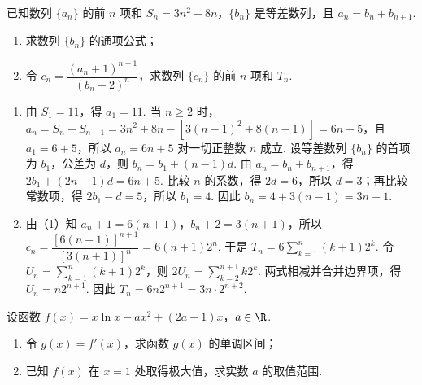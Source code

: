 \begin{problem}
已知数列 \(\{a_n\}\) 的前 \(n\) 项和 \(S_n=3n^2+8n\)，\(\{b_n\}\) 是等差数列，且 \(a_n=b_n+b_{n+1}\).

\begin{enumerate}
\item 求数列 \(\{b_n\}\) 的通项公式；
\item 令 \(c_n=\dfrac{(a_n+1)^{n+1}}{(b_n+2)^n}\)，求数列 \(\{c_n\}\) 的前 \(n\) 项和 \(T_n\).
\end{enumerate}
\end{problem}

\begin{solution}
\begin{enumerate}
\item 由 \(S_1=11\)，得 \(a_1=11\). 当 \(n\geq2\) 时，\(a_n=S_n-S_{n-1}=3n^2+8n-\left[3(n-1)^2+8(n-1)\right]=6n+5\)，且 \(a_1=6+5\)，所以 \(a_n=6n+5\) 对一切正整数 \(n\) 成立. 设等差数列 \(\{b_n\}\) 的首项为 \(b_1\)，公差为 \(d\)，则 \(b_n=b_1+(n-1)d\). 由 \(a_n=b_n+b_{n+1}\)，得 \(2b_1+(2n-1)d=6n+5\). 比较 \(n\) 的系数，得 \(2d=6\)，所以 \(d=3\)；再比较常数项，得 \(2b_1-d=5\)，所以 \(b_1=4\). 因此 \(b_n=4+3(n-1)=3n+1\).
\item 由（1）知 \(a_n+1=6(n+1)\)，\(b_n+2=3(n+1)\)，所以
\(c_n=\dfrac{[6(n+1)]^{n+1}}{[3(n+1)]^n}=6(n+1)2^n\). 于是
\(T_n=6\displaystyle\sum_{k=1}^n(k+1)2^k\). 令 \(U_n=\displaystyle\sum_{k=1}^n(k+1)2^k\)，则
\(2U_n=\displaystyle\sum_{k=2}^{n+1}k2^k\). 两式相减并合并边界项，得 \(U_n=n2^{n+1}\). 因此 \(T_n=6n2^{n+1}=3n\cdot2^{n+2}\).
\end{enumerate}
\end{solution}

\begin{problem}
设函数 \(f(x)=x\ln x-ax^2+(2a-1)x\)，\(a\in\R\).

\begin{enumerate}
\item 令 \(g(x)=f'(x)\)，求函数 \(g(x)\) 的单调区间；
\item 已知 \(f(x)\) 在 \(x=1\) 处取得极大值，求实数 \(a\) 的取值范围.
\end{enumerate}
\end{problem}

